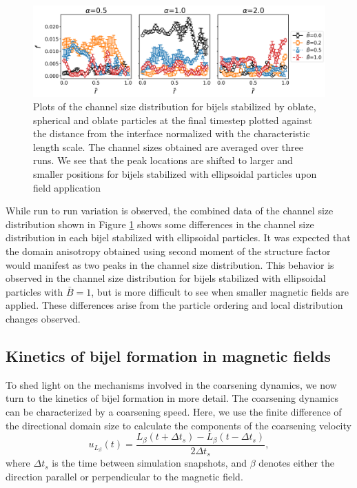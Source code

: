 \begin{figure} 
        \centering 
        \includegraphics[scale = 0.4]{figures/results/paper1/CSD_ss.png} 
        \caption{Plots of the channel size distribution for bijels stabilized by oblate, spherical and oblate particles at the final timestep plotted
                 against the distance from the interface normalized with the characteristic length scale. The channel sizes obtained are averaged over 
                 three runs. We see that the peak locations are shifted to larger and smaller positions for bijels stabilized with ellipsoidal particles
                 upon field application} 
        \label{fig:CSD_B_ss}
    \end{figure}

While run to run variation is observed, the combined data of the channel size distribution shown in Figure \ref{fig:CSD_B_ss} shows some differences 
in the channel size distribution in each bijel stabilized with ellipsoidal particles. It was expected that the domain anisotropy obtained using second moment of the 
structure factor would manifest as two peaks in the channel size distribution. \cite{karthikeyan_formation_2024} This behavior is observed in the channel size 
distribution for bijels stabilized with ellipsoidal particles with $\bar{B} = 1$, but is more difficult to see when smaller magnetic fields are applied. 
These differences arise from the particle ordering and local distribution changes observed. 

\subsection{Kinetics of bijel formation in magnetic fields}

To shed light on the mechanisms involved in the coarsening dynamics,
we now turn to the kinetics of bijel formation in more detail. The
coarsening dynamics can be characterized by a coarsening speed. Here,
we use the finite difference of the directional domain size to
calculate the components of the coarsening velocity
%
\begin{equation}
u_{L_\beta}(t) = \frac{L_\beta(t+\Delta t_s)-L_\beta(t-\Delta t_s)}{2\Delta t_s} ,
\end{equation}
%
where \(\Delta t_s\) is the time between simulation
snapshots, and $\beta$ denotes either the direction parallel or perpendicular to the magnetic field.

